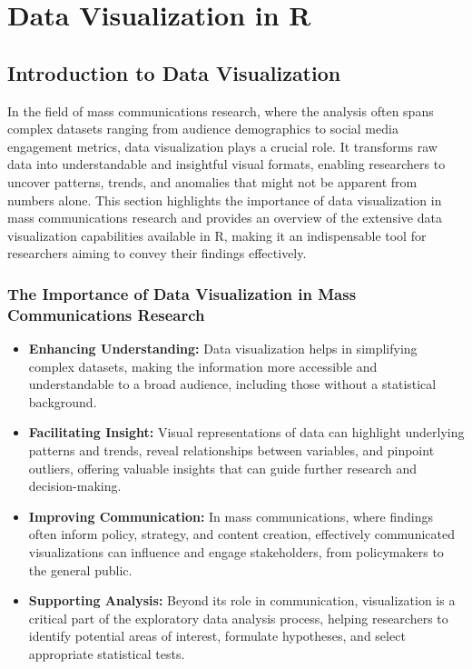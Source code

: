 \documentclass[
]{book}
\begin{document}
\chapter{Data Visualization in R}\label{data-visualization-in-r}

\section{Introduction to Data Visualization}\label{introduction-to-data-visualization}

In the field of mass communications research, where the analysis often spans complex datasets ranging from audience demographics to social media engagement metrics, data visualization plays a crucial role. It transforms raw data into understandable and insightful visual formats, enabling researchers to uncover patterns, trends, and anomalies that might not be apparent from numbers alone. This section highlights the importance of data visualization in mass communications research and provides an overview of the extensive data visualization capabilities available in R, making it an indispensable tool for researchers aiming to convey their findings effectively.

\subsection*{The Importance of Data Visualization in Mass Communications Research}\label{the-importance-of-data-visualization-in-mass-communications-research}

\begin{itemize}
\item
  \textbf{Enhancing Understanding:} Data visualization helps in simplifying complex datasets, making the information more accessible and understandable to a broad audience, including those without a statistical background.
\item
  \textbf{Facilitating Insight:} Visual representations of data can highlight underlying patterns and trends, reveal relationships between variables, and pinpoint outliers, offering valuable insights that can guide further research and decision-making.
\item
  \textbf{Improving Communication:} In mass communications, where findings often inform policy, strategy, and content creation, effectively communicated visualizations can influence and engage stakeholders, from policymakers to the general public.
\item
  \textbf{Supporting Analysis:} Beyond its role in communication, visualization is a critical part of the exploratory data analysis process, helping researchers to identify potential areas of interest, formulate hypotheses, and select appropriate statistical tests.
\end{itemize}
\end{document}
